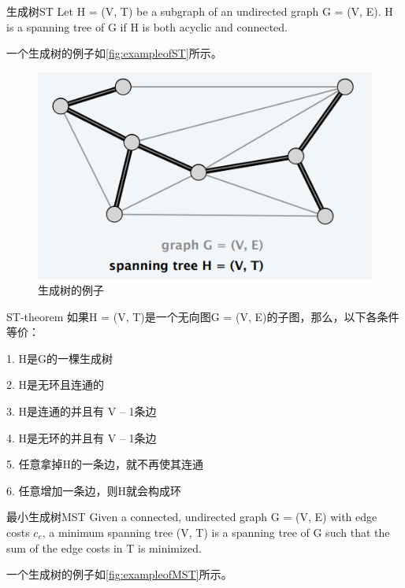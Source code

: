 \begin{definition}{生成树}{ST}
Let H = (V, T) be a subgraph of an undirected graph G = (V, E).
H is a spanning tree of G if H is both acyclic and connected.
\end{definition}

一个生成树的例子如\autoref{fig:exampleofST}所示。

\begin{figure}[hbt]
	\centering
	\includegraphics[scale=0.5]{image/exampleofST.png}
	\caption{生成树的例子}\label{fig:exampleofST}
\end{figure}

\begin{theorem}{}{ST-theorem}
	如果H = (V, T)是一个无向图G = (V, E)的子图，那么，以下各条件等价：

	1. H是G的一棵生成树

	2. H是无环且连通的

	3. H是连通的并且有 V – 1条边

	4. H是无环的并且有 V – 1条边

	5. 任意拿掉H的一条边，就不再使其连通

	6. 任意增加一条边，则H就会构成环

\end{theorem}

\begin{definition}{最小生成树}{MST}
	Given a connected, undirected graph G = (V, E) with edge costs $c_e$,
a minimum spanning tree (V, T) is a spanning tree of G such that the sum
of the edge costs in T is minimized.
\end{definition}

一个生成树的例子如\autoref{fig:exampleofMST}所示。

